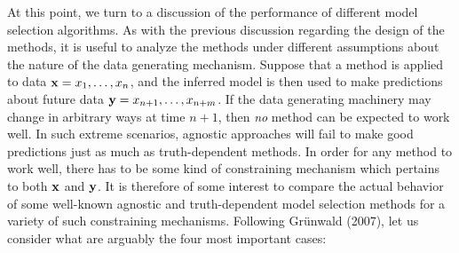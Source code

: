 \documentclass[authoryear]{elsarticle}
\begin{document}
At this point, we turn to a discussion of the performance of different model
selection algorithms. As with the previous discussion regarding the design
of the methods, it is useful to analyze the methods under
different assumptions about the nature of the data generating mechanism.
Suppose that a method is applied to data ${\bf x} = x_1, \ldots, x_n$, and the
inferred model is then used to make predictions about future data
${\bf y} = x_{n+1}, \ldots, x_{n+m}$. If the data generating machinery may
change in arbitrary ways at time $n+1$, then {\em no\/}
method can be expected to work well. In such extreme scenarios,
agnostic approaches will fail to make good predictions just as much as
truth-dependent methods. In order for any  method to work well,
there has to be some kind of constraining mechanism which pertains to both
${\bf x}$ and ${\bf y}$. It is therefore of some interest to compare
the actual behavior of some well-known agnostic and truth-dependent
model selection methods for a variety of such constraining
mechanisms. Following Gr\"unwald (2007), let us consider what are arguably the four most important
cases:
\end{document}
